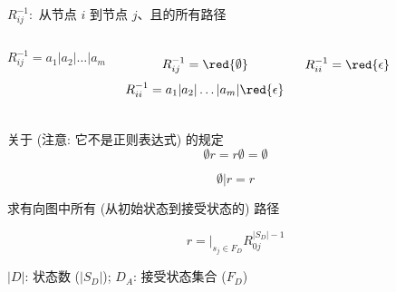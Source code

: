 \begin{frame}{}
  \begin{center}

    \vspace{0.30cm}
    $R^{-1}_{ij}:$ \pause 从节点 $i$ 到节点 $j$、且的所有路径
  \end{center}

  \pause
  \vspace{0.30cm}
  \begin{columns}
      \[
        R^{-1}_{ij} = a_{1} | a_{2} | \dots | a_{m}
      \]

      \[
        R^{-1}_{ij} = \red{\emptyset}
      \]
      \pause
      \[
        R^{-1}_{ii} = a_{1} | a_{2} | \dots | a_{m} | \red{\epsilon}
      \]

      \[
        R^{-1}_{ii} = \red{\epsilon}
      \]
  \end{columns}
\end{frame}

\begin{frame}{}
  \begin{center}
    关于 \red{$\emptyset$} (注意: 它不是正则表达式) 的规定
    \[
      \emptyset r = r \emptyset = \emptyset
    \]

    \[
      \emptyset | r = r
    \]
  \end{center}
\end{frame}

\begin{frame}{}
  \begin{center}

    \vspace{0.50cm}
    求有向图中所有 (从初始状态到接受状态的) 路径

    \pause
    \vspace{0.50cm}
    \[
      r = |_{s_{j} \in F_{D}} R^{|S_{D}| - 1}_{0j}
    \]
  \end{center}
\end{frame}

\begin{frame}{}

  \begin{center}
    $|D|$: 状态数 ($|S_{D}|$); \qquad $D_{A}$: 接受状态集合 ($F_{D}$)
  \end{center}
\end{frame}

